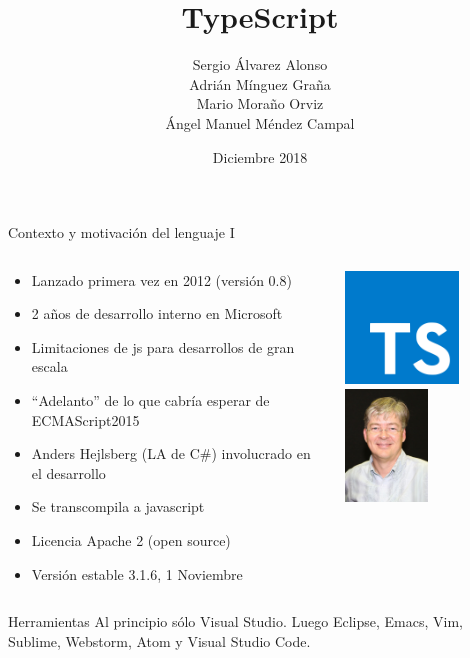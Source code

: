 \documentclass{beamer}
\title %
{TypeScript}
\author[Author, Anders] %
{Sergio Álvarez Alonso \\ Adrián Mínguez Graña \\  Mario Moraño Orviz \\ 
Ángel Manuel Méndez Campal}
\institute[Universities Here and There] %
{
	\inst{}%
	Máster ingeniería web\\
	Universidad de Oviedo

}
\date[KPT 2004] %
{Diciembre 2018}
\begin{document}
	
	\frame{\titlepage}
	
\small
\begin{frame}{Contexto y motivación del lenguaje I}
\begin{columns}[T] %
	\begin{column}[T]{8cm} %

		\begin{itemize}
			\item Lanzado primera vez en 2012 (versión 0.8)
			\item 2 años de desarrollo interno en Microsoft
			\item Limitaciones de js para desarrollos de gran escala
			\item ``Adelanto'' de lo que cabría esperar de ECMAScript2015
			\item Anders Hejlsberg (LA de C\#) involucrado en el desarrollo
			\item Se transcompila a javascript
			\item Licencia Apache 2 (open source)
			\item Versión estable 3.1.6, 1 Noviembre
		\end{itemize}
	
	\end{column}
	\begin{column}[T]{3cm} %
		\includegraphics[height=3cm]{imagenes/ts.png}
		\includegraphics[height=3cm]{imagenes/anders.jpg}
	\end{column}

\end{columns}

\begin{block}{Herramientas}
	Al principio sólo Visual Studio. Luego Eclipse, Emacs, Vim, Sublime, Webstorm,
	Atom y Visual Studio Code.
\end{block}

\end{frame}
\end{document}
